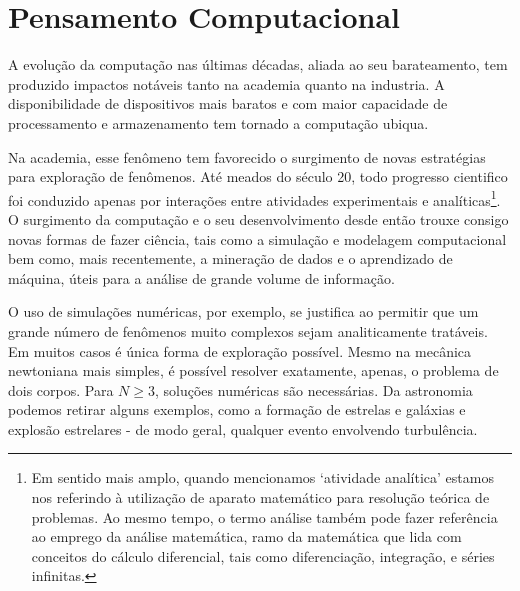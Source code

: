\chapter{Pensamento Computacional}\label{pensamento-computacional}





A evolução da computação nas últimas décadas, aliada ao seu barateamento, tem produzido impactos notáveis tanto na academia quanto na industria. A disponibilidade de dispositivos mais baratos e com maior capacidade de processamento e armazenamento tem tornado a computação ubiqua. 


Na academia, esse fenômeno tem favorecido o surgimento de novas estratégias para exploração de fenômenos. Até meados do século 20, todo progresso cientifico foi conduzido apenas por interações entre atividades experimentais e analíticas\footnote{
Em sentido mais amplo, quando mencionamos `atividade analítica' estamos nos referindo à utilização de aparato matemático para resolução teórica de problemas. Ao mesmo tempo, o termo análise também pode fazer referência ao emprego da análise matemática, ramo da matemática que lida com conceitos do cálculo diferencial, tais como diferenciação, integração, e séries infinitas.}. O surgimento da computação e o seu desenvolvimento desde então trouxe consigo novas formas de fazer ciência, tais como a simulação e modelagem computacional bem como, mais recentemente, a mineração de dados e o aprendizado de máquina, úteis para a análise de grande volume de informação. \cite{Djorgovski2005, wing2006} %


O uso de simulações numéricas, por exemplo, se justifica ao permitir que um grande número de fenômenos muito complexos sejam analiticamente tratáveis. Em muitos casos é única forma de exploração possível. Mesmo na mecânica newtoniana mais simples, é possível resolver  exatamente, apenas, o problema de dois corpos. Para $N\geq3$, soluções numéricas são necessárias. Da astronomia podemos retirar alguns exemplos, como a formação de estrelas e galáxias e explosão estrelares - de modo geral, qualquer evento envolvendo turbulência.  \cite[]{Djorgovski2005} %

